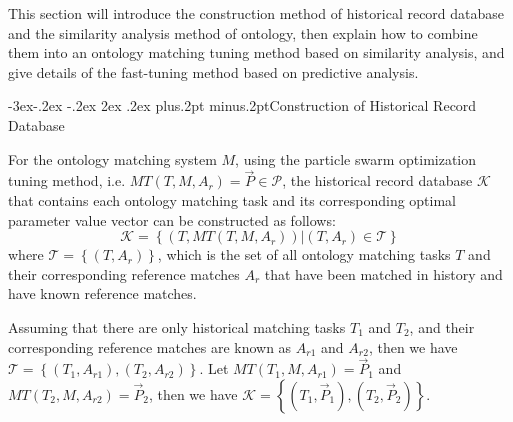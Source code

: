 \documentclass[twoside]{article}
\makeatletter
\def\subsection{\@startsection{subsection}{2}{\z@}%
 {-3ex\@plus -.2ex \@minus -.2ex}%
 {2ex \@plus.2ex}%
{\normalfont\normalsize\protect\baselineskip=12.5pt plus.2pt minus.2pt\bfseries}}
\makeatother
\begin{document}

This section will introduce the construction method of historical record database and the similarity analysis method of ontology, then explain how to combine them into an ontology matching tuning method based on similarity analysis, and give details of the fast-tuning method based on predictive analysis.




\subsection{Construction of Historical Record Database}

For the ontology matching system $M$, using the particle swarm optimization tuning method, i.e. $M T\left(T, M, A_{r}\right)=\vec{P} \in \mathcal{P}$, the historical record database $\mathcal{K}$ that contains each ontology matching task and its corresponding optimal parameter value vector can be constructed as follows:
$$
\mathcal{K}=\left\{\left(T, M T\left(T, M, A_{r}\right)\right) |\left(T, A_{r}\right) \in \mathcal{T}\right\}
$$
where $\mathcal{T}=\left\{\left(T, A_{r}\right)\right\}$, which is the set of all ontology matching tasks $T$ and their corresponding reference matches $A_{r}$ that have been matched in history and have known reference matches.

Assuming that there are only historical matching tasks ${T_{1}}$ and ${T_{2}}$,
and their corresponding reference matches are known as ${A_{r 1}}$ and ${A_{r 2}}$,
then we have $\mathcal{T}=\left\{\left(T_{1}, A_{r 1}\right),\left(T_{2}, A_{r 2}\right)\right\}$.
Let $M T\left(T_{1}, M, A_{r 1}\right)=\vec{P}_{1}$ and $M T\left(T_{2}, M, A_{r 2}\right)=\vec{P}_{2}$,
then we have $\mathcal{K}=\left\{\left(T_{1}, \vec{P}_{1}\right),\left(T_{2}, \vec{P}_{2}\right)\right\}$.
\end{document}
